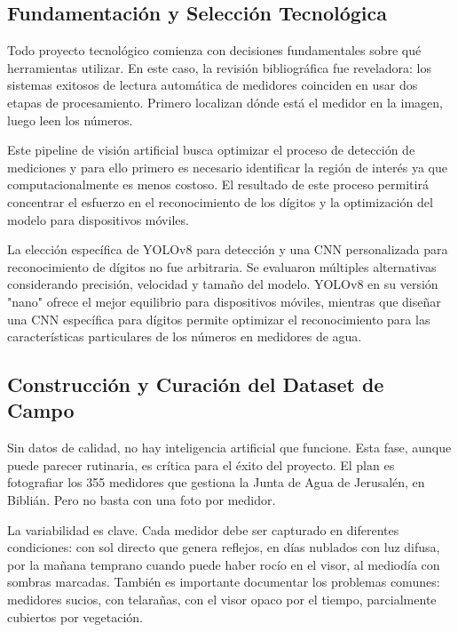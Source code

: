 \subsection{Fundamentación y Selección Tecnológica}
\label{ssec:tech_foundation}

Todo proyecto tecnológico comienza con decisiones fundamentales sobre qué herramientas utilizar. En este caso, la revisión bibliográfica fue reveladora: los sistemas exitosos de lectura automática de medidores coinciden en usar dos etapas de procesamiento. Primero localizan dónde está el medidor en la imagen, luego leen los números.

Este pipeline de visión artificial busca optimizar el proceso de detección de mediciones y para ello primero es necesario identificar la región de interés ya que computacionalmente es menos costoso. El resultado de este proceso permitirá concentrar el esfuerzo en el reconocimiento de los dígitos y la optimización del modelo para dispositivos móviles. 

La elección específica de YOLOv8 para detección y una CNN personalizada para reconocimiento de dígitos no fue arbitraria. Se evaluaron múltiples alternativas considerando precisión, velocidad y tamaño del modelo. YOLOv8 en su versión "nano" ofrece el mejor equilibrio para dispositivos móviles, mientras que diseñar una CNN específica para dígitos permite optimizar el reconocimiento para las características particulares de los números en medidores de agua.

\subsection{Construcción y Curación del Dataset de Campo}
\label{ssec:dataset_construction}

Sin datos de calidad, no hay inteligencia artificial que funcione. Esta fase, aunque puede parecer rutinaria, es crítica para el éxito del proyecto. El plan es fotografiar los 355 medidores que gestiona la Junta de Agua de Jerusalén, en Biblián. Pero no basta con una foto por medidor.

La variabilidad es clave. Cada medidor debe ser capturado en diferentes condiciones: con sol directo que genera reflejos, en días nublados con luz difusa, por la mañana temprano cuando puede haber rocío en el visor, al mediodía con sombras marcadas. También es importante documentar los problemas comunes: medidores sucios, con telarañas, con el visor opaco por el tiempo, parcialmente cubiertos por vegetación.

